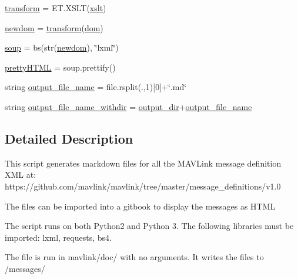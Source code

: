 \begin{DoxyCompactItemize}
\item 
\mbox{\hyperlink{namespacemavlink__gitbook_a3dbbd9ffdef79cdd3d0bc10c5eac95e6}{transform}} = E\+T.\+X\+S\+LT(\mbox{\hyperlink{namespacemavlink__gitbook_a6fdcf2e9551166072265847a9efbcc9b}{xslt}})
\item 
\mbox{\hyperlink{namespacemavlink__gitbook_a539be0135e50ed256965d635c039bbdf}{newdom}} = \mbox{\hyperlink{namespacemavlink__gitbook_a3dbbd9ffdef79cdd3d0bc10c5eac95e6}{transform}}(\mbox{\hyperlink{namespacemavlink__gitbook_a5f783465a58c3fc0dc9a7c5513c06e77}{dom}})
\item 
\mbox{\hyperlink{namespacemavlink__gitbook_a92e67a31e7a0bf86bd2e071093781f53}{soup}} = bs(str(\mbox{\hyperlink{namespacemavlink__gitbook_a539be0135e50ed256965d635c039bbdf}{newdom}}), \char`\"{}lxml\char`\"{})
\item 
\mbox{\hyperlink{namespacemavlink__gitbook_acbe59884e9f0522fe46d6244b01a4dc6}{pretty\+H\+T\+ML}} = soup.\+prettify()
\item 
string \mbox{\hyperlink{namespacemavlink__gitbook_a65b46bdd34434cd895d50866a39e1fc5}{output\+\_\+file\+\_\+name}} = file.\+rsplit(\textquotesingle{}.\textquotesingle{},1)\mbox{[}0\mbox{]}+\char`\"{}.md\char`\"{}
\item 
string \mbox{\hyperlink{namespacemavlink__gitbook_a2413062a1a5a2b6580e3bfa5b8240049}{output\+\_\+file\+\_\+name\+\_\+withdir}} = \mbox{\hyperlink{namespacemavlink__gitbook_a038f966b01c8835bbafb0d301aafc036}{output\+\_\+dir}}+\mbox{\hyperlink{namespacemavlink__gitbook_a65b46bdd34434cd895d50866a39e1fc5}{output\+\_\+file\+\_\+name}}
\end{DoxyCompactItemize}


\subsection{Detailed Description}
\begin{DoxyVerb}This script generates markdown files for all the MAVLink message definition XML at: 
https://github.com/mavlink/mavlink/tree/master/message_definitions/v1.0
  
The files can be imported into a gitbook to display the messages as HTML

The script runs on both Python2 and Python 3. The following libraries must be imported: lxml, requests, bs4.

The file is run in mavlink/doc/ with no arguments. It writes the files to /messages/
\end{DoxyVerb}
 

